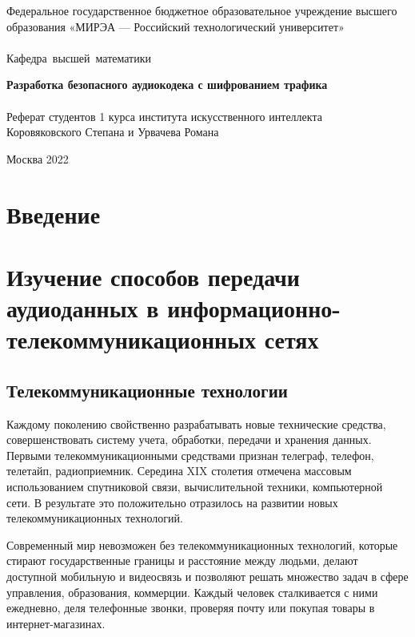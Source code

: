 \documentclass[a4paper]{report}
\begin{document}
\begin{titlepage}
\newpage



\begin{center}
\vfill

Федеральное государственное бюджетное образовательное учреждение высшего образования «МИРЭА — Российский технологический университет»\\
\ \\

\hfill\vbox
{
\hbox{Кафедра высшей математики}
}

\vfill

{\large\bf Разработка безопасного аудиокодека с шифрованием трафика\\}
\ \\
Реферат студентов 1 курса института искусственного интеллекта\\
Коровяковского Степана и Урвачева Романа

\vfill


\vfill

Москва 2022
\end{center}

\end{titlepage}
\tableofcontents
\newpage
\chapter*{Введение}
\chapter{Изучение способов передачи аудиоданных в информационно-телекоммуникационных сетях}
\section{Телекоммуникационные технологии}
Каждому поколению свойственно разрабатывать новые технические средства, совершенствовать систему учета, обработки, передачи и хранения данных. Первыми телекоммуникационными средствами признан телеграф, телефон, телетайп, радиоприемник. Середина XIX столетия отмечена массовым использованием спутниковой связи, вычислительной техники, компьютерной сети. В результате это положительно отразилось на развитии новых телекоммуникационных технологий.
\par Современный мир невозможен без телекоммуникационных технологий, которые стирают государственные границы и расстояние между людьми, делают доступной мобильную и видеосвязь и позволяют решать множество задач в сфере управления, образования, коммерции. Каждый человек сталкивается с ними ежедневно, деля телефонные звонки, проверяя почту или покупая товары в интернет-магазинах.
\end{document}
